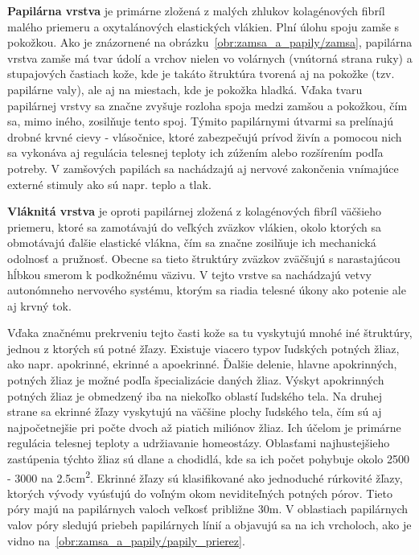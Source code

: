   \textbf{Papilárna vrstva} je primárne zložená z malých zhlukov kolagénových fibríl malého priemeru a oxytalánových elastických vlákien.
  Plní úlohu spoju zamše s pokožkou. Ako je znázornené na obrázku~{\ref{obr:zamsa_a_papily/zamsa}}, papilárna vrstva zamše má tvar údolí a vrchov
  nielen vo volárnych (vnútorná strana ruky) a stupajových častiach kože, kde je takáto štruktúra tvorená aj na pokožke (tzv. papilárne valy), ale aj na miestach,
  kde je pokožka hladká. Vďaka tvaru papilárnej vrstvy sa značne zvyšuje rozloha spoja medzi zamšou a pokožkou, čím sa, mimo iného, zosilňuje tento spoj.
  Týmito papilárnymi útvarmi sa prelínajú drobné krvné cievy - vlásočnice, ktoré zabezpečujú prívod živín a pomocou nich sa vykonáva aj regulácia telesnej
  teploty ich zúžením alebo rozšírením podľa potreby. V zamšových papilách sa nachádzajú aj nervové zakončenia vnímajúce externé stimuly ako sú napr. teplo a tlak. 

  \textbf{Vláknitá vrstva} je oproti papilárnej zložená z kolagénových fibríl väčšieho priemeru, ktoré sa zamotávajú do veľkých zväzkov vlákien,
  okolo ktorých sa obmotávajú ďalšie elastické vlákna, čím sa značne zosilňuje ich mechanická odolnosť a pružnosť. Obecne sa tieto štruktúry zväzkov zväčšujú
  s narastajúcou hĺbkou smerom k podkožnému väzivu. V tejto vrstve sa nachádzajú vetvy autonómneho nervového systému, ktorým sa riadia telesné úkony ako potenie
  ale aj krvný tok.

  Vďaka značnému prekrveniu tejto časti kože sa tu vyskytujú mnohé iné štruktúry, jednou z ktorých sú potné žľazy. Existuje viacero typov ľudských
  potných žliaz, ako napr. apokrinné, ekrinné a apoekrinné. Ďalšie delenie, hlavne apokrinných, potných žliaz je možné podľa špecializácie daných žliaz.
  Výskyt apokrinných potných žliaz je obmedzený iba na niekoľko oblastí ľudského tela. Na druhej strane sa ekrinné žľazy vyskytujú na väčšine plochy
  ľudského tela, čím sú aj najpočetnejšie pri počte dvoch až piatich miliónov žliaz. Ich účelom je primárne regulácia telesnej teploty a udržiavanie homeostázy.
  Oblasťami najhustejšieho zastúpenia týchto žliaz sú dlane a chodidlá, kde sa ich počet pohybuje okolo 2500 - 3000 na 2.5cm\textsuperscript{2}.
  Ekrinné žľazy sú klasifikované ako jednoduché rúrkovité žľazy, ktorých vývody vyúsťujú do voľným okom neviditeľných potných pórov. Tieto póry majú
  na papilárnych valoch veľkosť približne 30\textmugreek{}m. V oblastiach papilárnych valov póry sledujú priebeh papilárnych línií a objavujú sa na ich vrcholoch,
  ako je vidno na~{\ref{obr:zamsa_a_papily/papily_prierez}}.
  
